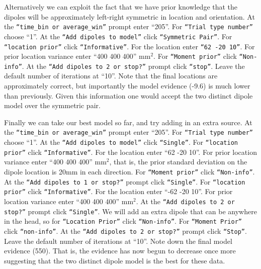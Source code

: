 Alternatively we can exploit the fact that we have prior knowledge that the dipoles will be approximately left-right symmetric in location and orientation. At the \texttt{``time\_bin or average\_win''} prompt enter ``205''.  For \texttt{``Trial type number''} choose ``1''. At the \texttt{``Add dipoles to model''} click \texttt{``Symmetric Pair''}. For \texttt{``location prior''} click \texttt{``Informative''}. For the location enter \texttt{``62 -20 10''}. For prior location variance enter ``400 400 400'' mm$^2$. For \texttt{``Moment prior''} click \texttt{``Non-info''}. At the \texttt{``Add dipoles to 2 or stop?''} prompt click \texttt{``stop''}. Leave the default number of iterations at ``10''. Note that the final locations are approximately correct, but importantly the model evidence (-9.6) is much lower than previously. Given this information one would accept the two distinct dipole model over the symmetric pair. 

Finally we can take our best model so far, and try adding in an extra source.
At the \texttt{``time\_bin or average\_win''} prompt enter ``205''. For \texttt{``Trial type number''} choose ``1''. At the \texttt{``Add dipoles to model''} click \texttt{``Single''}. For \texttt{``location prior''} click \texttt{``Informative''}. For the location enter ``62 -20 10''. For prior location variance enter ``400 400 400'' mm$^2$, that is, the prior standard deviation on the dipole location is 20mm in each direction. For \texttt{``Moment prior''} click \texttt{``Non-info''}. At the \texttt{``Add dipoles to 1 or stop?''} prompt click \texttt{``Single''}. For \texttt{``location prior''} click \texttt{``Informative''}. For the location enter ``-62 -20 10''. For prior location variance enter ``400 400 400'' mm$^2$. At the \texttt{``Add dipoles to 2 or stop?''} prompt click \texttt{``Single''}. We will add an extra dipole that can be anywhere in the head, so for \texttt{``Location Prior''} click \texttt{``Non-info''}. For \texttt{``Moment Prior''} click \texttt{``non-info''}. At the \texttt{``Add dipoles to 2 or stop?''} prompt click \texttt{``Stop''}. Leave the default number of iterations at ``10''. Note down the final model evidence (550). That is, the evidence has now begun to decrease once more suggesting that the two distinct dipole model is the best for these data.

